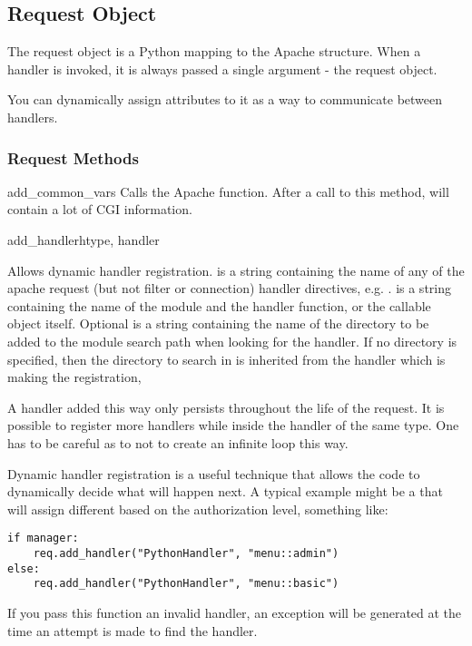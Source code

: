 \subsection{Request Object\label{pyapi-mprequest}}

The request object is a Python mapping to the Apache
 structure. When a handler is invoked, it is always
passed a single argument - the request object. 

You can dynamically assign attributes to it as a way to communicate
between handlers.

\subsubsection{Request Methods\label{pyapi-mprequest-meth}}

\begin{methoddesc}[request]{add_common_vars}{}
  Calls the Apache  function. After a
  call to this method,  will contain a
  lot of CGI information.
\end{methoddesc}

\begin{methoddesc}[request]{add_handler}{htype, handler}

  Allows dynamic handler registration.  is a string
  containing the name of any of the apache request (but not filter or
  connection) handler directives,
  e.g. .  is a string containing the
  name of the module and the handler function, or the callable object
  itself. Optional  is a string containing the name of the
  directory to be added to the module search path when looking for the
  handler. If no directory is specified, then the directory to search
  in is inherited from the handler which is making the registration,

  A handler added this way only persists throughout the life of the
  request. It is possible to register more handlers while inside the
  handler of the same type. One has to be careful as to not to create an
  infinite loop this way.

  Dynamic handler registration is a useful technique that allows the
  code to dynamically decide what will happen next. A typical example
  might be a  that will assign different
   based on the authorization level, something
  like:

  \begin{verbatim}
if manager:
    req.add_handler("PythonHandler", "menu::admin")
else:
    req.add_handler("PythonHandler", "menu::basic")
  \end{verbatim}                              

  \begin{notice}
    If you pass this function an invalid handler, an exception will be
    generated at the time an attempt is made to find the handler. 
  \end{notice}

\end{methoddesc}

